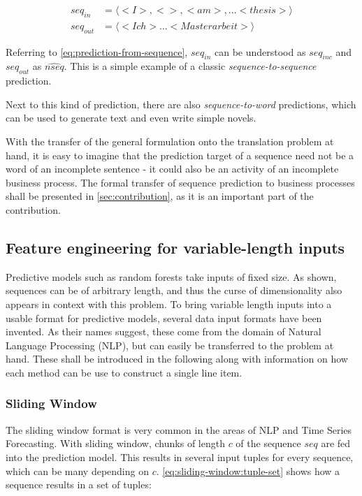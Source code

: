 \begin{equation*}
\begin{split}
seq_{in} &= \langle<I>, < >, <am>, ... <thesis>\rangle\\
seq_{out} &= \langle<Ich> ... <Masterarbeit>\rangle
\end{split}
\end{equation*}

Referring to \autoref{eq:prediction-from-sequence}, $seq_{in}$ can be understood as $seq_{inc}$ and $seq_{out}$ as $\widehat{nseq}$. This is a simple example of a classic \textit{sequence-to-sequence} prediction.

Next to this kind of prediction, there are also \textit{sequence-to-word} predictions, which can be used to generate text and even write simple novels.

With the transfer of the general formulation onto the translation problem at hand, it is easy to imagine that the prediction target of a sequence need not be a word of an incomplete sentence - it could also be an activity of an incomplete business process. The formal transfer of sequence prediction to business processes shall be presented in \autoref{sec:contribution}, as it is an important part of the contribution.

\subsection{Feature engineering for variable-length inputs}
Predictive models such as random forests take inputs of fixed size. As shown, sequences can be of arbitrary length, and thus the curse of dimensionality also appears in context with this problem. To bring variable length inputs into a usable format for predictive models, several data input formats have been invented. As their names suggest, these come from the domain of Natural Language Processing (NLP), but can easily be transferred to the problem at hand. These shall be introduced in the following along with information on how each method can be use to construct a single line item.

\subsubsection{Sliding Window}
The sliding window format is very common in the areas of NLP and Time Series Forecasting. With sliding window, chunks of length $c$ of the sequence $seq$ are fed into the prediction model. This results in several input tuples for every sequence, which can be many depending on $c$. \autoref{eq:sliding-window:tuple-set} shows how a sequence results in a set of tuples:

